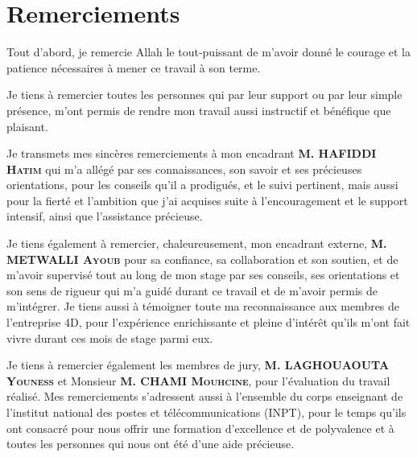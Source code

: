\chapter*{Remerciements}


Tout d’abord, je remercie Allah le tout-puissant de m’avoir donné le courage et la patience nécessaires à mener ce travail à son terme.

\vspace{10pt}
Je tiens à remercier toutes les personnes qui par leur support ou par leur simple présence, m'ont permis de rendre mon travail aussi instructif et bénéfique que plaisant.

\vspace{10pt}
Je transmets mes sincères remerciements à mon encadrant \textbf{M. HAFIDDI \textsc{Hatim}} qui m'a allégé par ses connaissances, son savoir et ses précieuses orientations, pour les conseils qu’il a prodigués, et le suivi pertinent, mais aussi pour la fierté et l’ambition que j'ai acquises suite à l’encouragement et le support intensif, ainsi que l’assistance précieuse.

\vspace{10pt}
Je tiens également à remercier, chaleureusement, mon encadrant externe, \textbf{M. METWALLI \textsc{Ayoub}} pour sa confiance, sa collaboration et son soutien, et de m’avoir supervisé tout au long de mon stage par ses conseils, ses orientations et son sens de rigueur qui m’a guidé durant ce travail et de m’avoir permis de m’intégrer. Je tiens aussi à témoigner toute ma reconnaissance aux membres de l’entreprise 4D, pour l’expérience enrichissante et pleine d’intérêt qu’ils m’ont fait vivre durant ces mois de stage parmi eux.

\vspace{10pt}
Je tiens à remercier également les membres de jury, \textbf{M. LAGHOUAOUTA \textsc{Youness}} et Monsieur \textbf{M. CHAMI \textsc{Mouhcine}}, pour l’évaluation du travail réalisé. Mes remerciements s’adressent aussi à l’ensemble du corps enseignant de l’institut national des postes et télécommunications (INPT), pour le temps qu’ils ont consacré pour nous offrir une formation d’excellence et de polyvalence et à toutes les personnes qui nous ont été d’une aide précieuse.
